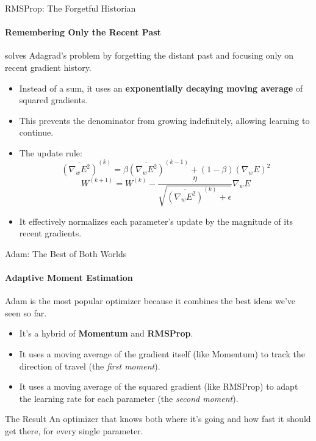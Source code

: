 \begin{frame}{RMSProp: The Forgetful Historian}
    \framesubtitle{Remembering Only the Recent Past}
     solves Adagrad's problem by forgetting the distant past and focusing only on recent gradient history.
    \begin{itemize}
        \item Instead of a sum, it uses an \textbf{exponentially decaying moving average} of squared gradients.
        \item This prevents the denominator from growing indefinitely, allowing learning to continue.
        \item The update rule:
            $$ \overline{(\nabla_w E^2)}^{(k)} = \beta \overline{(\nabla_w E^2)}^{(k-1)} + (1-\beta)(\nabla_w E)^2 $$
            $$ W^{(k+1)} = W^{(k)} - \frac{\eta}{\sqrt{\overline{(\nabla_w E^2)}^{(k)} + \epsilon}} \nabla_w E $$
        \item It effectively normalizes each parameter's update by the magnitude of its recent gradients.
    \end{itemize}
\end{frame}

\begin{frame}{Adam: The Best of Both Worlds}
    \framesubtitle{Adaptive Moment Estimation}
    Adam is the most popular optimizer because it combines the best ideas we've seen so far.
    \begin{itemize}
        \item It's a hybrid of \textbf{Momentum} and \textbf{RMSProp}.
        \item It uses a moving average of the gradient itself (like Momentum) to track the direction of travel (the \textit{first moment}).
        \item It uses a moving average of the squared gradient (like RMSProp) to adapt the learning rate for each parameter (the \textit{second moment}).
    \end{itemize}
    \begin{alertblock}{The Result}
        An optimizer that knows both where it's going and how fast it should get there, for every single parameter.
    \end{alertblock}
\end{frame}

